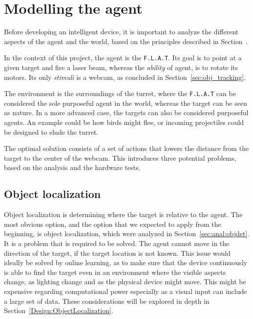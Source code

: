 \section{Modelling the agent}\label{Design:MI}
Before developing an intelligent device, it is important to analyze the different aspects of the agent and the world, based on the principles described in Section~.


In the context of this project, the agent is the \texttt{F.L.A.T}.
Its goal is to point at a given target and fire a laser beam, whereas the \textit{ability} of agent, is to rotate its motors.
Its only \textit{stimuli} is a webcam, as concluded in Section~\ref{sec:obj_tracking}.

The environment is the surroundings of the turret, where the \texttt{F.L.A.T} can be considered the sole purposeful agent in the world, whereas the target can be seen as nature.
In a more advanced case, the targets can also be considered purposeful agents.
An example could be how birds might flee, or incoming projectiles could be designed to elude the turret.

The optimal solution consists of a set of actions that lowers the distance from the target to the center of the webcam.
This introduces three potential problems, based on the analysis and the hardware tests.



\subsection{Object localization}
Object localization is determining where the target is relative to the agent.
The most obvious option, and the option that we expected to apply from the beginning, is object localization, which were analyzed in Section~\ref{sec:anal:objdet}.
It is a problem that is required to be solved. The agent cannot move in the direction of the target, if the target location is not known.
This issue would ideally be solved by online learning, as to make sure that the device continuously is able to find the target even in an environment where the visible aspects change, as lighting change and as the physical device might move. 
This might be expensive regarding computational power especially as a visual input can include a large set of data.
These considerations will be explored in depth in Section~\ref{Design:ObjectLocalization}.

